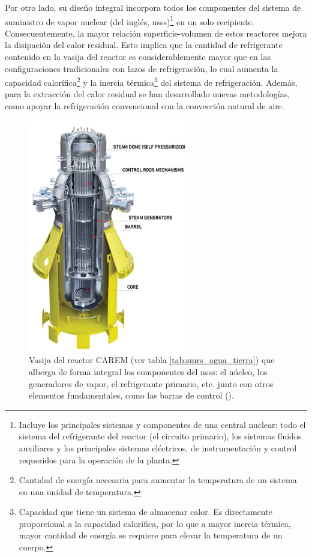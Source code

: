 Por otro lado, su diseño integral incorpora todos los componentes del \gls{sistema de suministro de vapor nuclear} (del inglés, \acrshort{nsss})\footnote{Incluye los principales sistemas y componentes de una central nuclear: todo el sistema del refrigerante del reactor (el circuito primario), los sistemas fluidos auxiliares y los principales sistemas eléctricos, de instrumentación y control requeridos para la operación de la planta.} en un solo recipiente. Consecuentemente, la mayor relación superficie-volumen de estos reactores mejora la disipación del calor residual. Esto implica que la cantidad de refrigerante contenido en la vasija del reactor es considerablemente mayor que en las configuraciones tradicionales con lazos de refrigeración, lo cual aumenta la capacidad calorífica\footnote{Cantidad de energía necesaria para aumentar la temperatura de un sistema en una unidad de temperatura.} y la inercia térmica\footnote{Capacidad que tiene un sistema de almacenar calor. Es directamente proporcional a la capacidad calorífica, por lo que a mayor inercia térmica, mayor cantidad de energía se requiere para elevar la temperatura de un cuerpo.} del sistema de refrigeración. Además, para la extracción del calor residual se han desarrollado nuevas metodologías, como apoyar la refrigeración convencional con la convección natural de aire.

\begin{figure}[h]
  \centering
  \includegraphics[width=0.62\textwidth]{content/figures/carem.jpeg}
  \caption{Vasija del reactor CAREM (ver tabla \ref{tab:smrs_agua_tierra}) que alberga de forma integral los componentes del \acrshort{nsss}: el núcleo, los generadores de vapor, el refrigerante primario, etc. junto con otros elementos fundamentales, como las barras de control (\cite{iaea_smr_booklet_2022}).}
  \label{fig:carem}
\end{figure}

